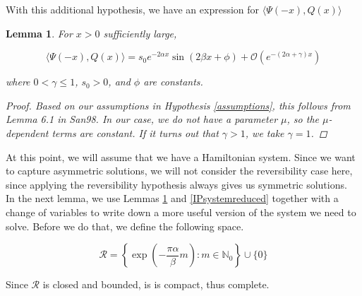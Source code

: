 \documentclass[12pt]{article}
\def\N{{\mathbb N}}
\newtheorem{lemma}{Lemma}
\begin{document}
With this additional hypothesis, we have an expression for $\langle \Psi(-x), Q(x) \rangle$


\begin{lemma}\label{IPform}
For $x > 0$ sufficiently large,

\begin{equation}\label{IPalphabeta}
\langle \Psi(-x), Q(x) \rangle
= s_0 e^{-2 \alpha x} \sin(2 \beta x + \phi) + \mathcal{O}(e^{-(2 \alpha + \gamma) x})
\end{equation}

where $0 < \gamma \leq 1$, $s_0 > 0$, and $\phi$ are constants.
\begin{proof}
Based on our assumptions in Hypothesis \ref{assumptions}, this follows from Lemma 6.1 in San98. In our case, we do not have a parameter $\mu$, so the $\mu$-dependent terms are constant. If it turns out that $\gamma > 1$, we take $\gamma = 1$.
\end{proof}
\end{lemma}

At this point, we will assume that we have a Hamiltonian system. Since we want to capture asymmetric solutions, we will not consider the reversibility case here, since applying the reversibility hypothesis always gives us symmetric solutions.\\

In the next lemma, we use Lemmas \ref{IPform} and \ref{IPsystemreduced} together with a change of variables to write down a more useful version of the system we need to solve. Before we do that, we define the following space.

\begin{equation}\label{setR}
\mathcal{R} = \left\{ \exp\left(-\frac{\pi \alpha}{\beta}m\right) : m \in \N_0 \right\} \cup \{ 0 \}
\end{equation}

Since $\mathcal{R}$ is closed and bounded, is is compact, thus complete.

\end{document}
